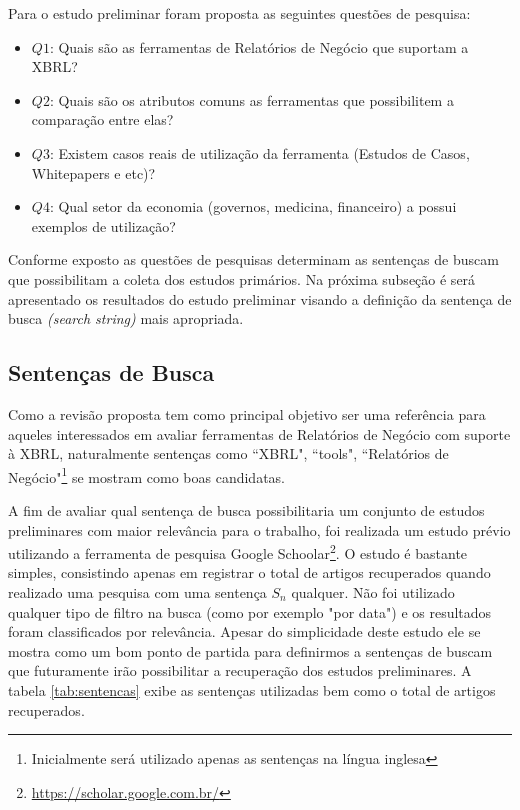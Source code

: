 \documentclass{article}
\begin{document}
Para o estudo preliminar foram proposta as seguintes questões de pesquisa:
\begin{itemize}
  \item \textbf{$Q1$}: Quais são as ferramentas de Relatórios de Negócio que
    suportam a XBRL?
  \item \textbf{$Q2$}: Quais são os atributos comuns as ferramentas
    que possibilitem a comparação entre elas?
  \item \textbf{$Q3$}: Existem casos reais de utilização da ferramenta
    (Estudos de Casos, Whitepapers e etc)?
  \item \textbf{$Q4$}: Qual setor da economia (governos, medicina, financeiro) a
    possui exemplos de utilização?
\end{itemize}

Conforme exposto as questões de pesquisas determinam as sentenças de
buscam que possibilitam a coleta dos estudos primários. Na próxima
subseção é será apresentado os resultados do estudo preliminar visando
a definição da sentença de busca \textit{(search string)} mais apropriada.

\subsection{Sentenças de Busca}
\label{subsec:setences}

Como a revisão proposta tem como principal objetivo ser uma referência para aqueles interessados em avaliar ferramentas de Relatórios de Negócio com suporte à XBRL, naturalmente sentenças como ``XBRL", ``tools", ``Relatórios de Negócio"\footnote{Inicialmente será utilizado apenas as sentenças na língua inglesa} se mostram como boas candidatas. 

A fim de avaliar qual sentença de busca possibilitaria um conjunto de
estudos preliminares com maior relevância para o trabalho, foi
realizada um estudo prévio utilizando a ferramenta de pesquisa Google
Schoolar\footnote{\url{https://scholar.google.com.br/}}. O estudo é
bastante simples, consistindo apenas em registrar o total de artigos
recuperados quando realizado uma pesquisa com uma sentença $S_n$
qualquer. Não foi utilizado qualquer tipo de filtro na busca (como por
exemplo "por data") e os resultados foram classificados por
relevância. Apesar do simplicidade deste estudo ele se mostra como um
bom ponto de partida para definirmos a sentenças de buscam que
futuramente irão possibilitar a recuperação dos estudos preliminares. A tabela \ref{tab:sentencas} exibe as sentenças utilizadas bem como o total de artigos recuperados.
\end{document}
